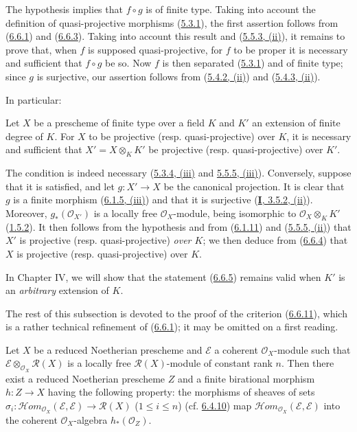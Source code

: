The hypothesis implies that $f\circ g$ is of finite type. Taking into account
the definition of quasi-projective morphisms
(\hyperref[II.5.3.1]{5.3.1}), the first assertion follows from
(\hyperref[II.6.6.1]{6.6.1}) and
(\hyperref[II.6.6.3]{6.6.3}). Taking into account this result and
(\hyperref[II.5.5.3]{5.5.3, (ii)}), it remains to prove that, when $f$ is
supposed quasi-projective, for $f$ to be proper it is necessary and
sufficient that $f\circ g$ be so. Now $f$ is then separated
(\hyperref[II.5.3.1]{5.3.1}) and of finite type; since $g$ is surjective,
our assertion follows from (\hyperref[II.5.4.2]{5.4.2, (ii)}) and
(\hyperref[II.5.4.3]{5.4.3, (ii)}).

In particular:

\begin{corollary}[6.6.5]
\label{II.6.6.5}
Let $X$ be a prescheme of finite type over a field $K$ and $K'$ an extension
of finite degree of $K$. For $X$ to be projective \textup{(resp.} quasi-projective\textup{)}
over $K$, it is necessary and sufficient that $X'=X\otimes_K K'$ be
projective \textup{(resp.} quasi-projective\textup{)} over $K'$.
\end{corollary}

The condition is indeed necessary
(\hyperref[II.5.3.4]{5.3.4, (iii)} and
\hyperref[II.5.5.5]{5.5.5, (iii)}). Conversely, suppose that it is
satisfied, and let $g:X'\to X$ be the canonical projection. It is clear that
$g$ is a finite morphism (\hyperref[II.6.1.5]{6.1.5, (iii)}) and that it is
surjective (\hyperref[I.3.5.2]{\textbf{I}, 3.5.2, (ii)}). Moreover,
$g_*(\mathcal{O}_{X'})$ is a locally free $\mathcal{O}_X$-module, being
isomorphic to $\mathcal{O}_X\otimes_K K'$
(\hyperref[II.1.5.2]{1.5.2}). It then follows from the hypothesis and from
(\hyperref[II.6.1.11]{6.1.11}) and
(\hyperref[II.5.5.5]{5.5.5, (ii)}) that $X'$ is projective (resp.
quasi-projective) \emph{over $K$}; we then deduce from
(\hyperref[II.6.6.4]{6.6.4}) that $X$ is projective (resp.
quasi-projective) over $K$.

In Chapter IV, we will show that the statement
(\hyperref[II.6.6.5]{6.6.5}) remains valid when $K'$ is an
\emph{arbitrary} extension of $K$.

The rest of this subsection is devoted to the proof of the criterion
(\hyperref[II.6.6.11]{6.6.11}), which is a rather technical refinement of
(\hyperref[II.6.6.1]{6.6.1}); it may be omitted on a first reading.

\begin{lemma}[6.6.6]
\label{II.6.6.6}
Let $X$ be a reduced Noetherian prescheme and $\mathcal{E}$ a coherent
$\mathcal{O}_X$-module such that
$\mathcal{E}\otimes_{\mathcal{O}_X}\mathcal{R}(X)$ is a locally free
$\mathcal{R}(X)$-module of constant rank $n$. Then there exist
a reduced Noetherian prescheme $Z$ and a finite birational morphism
$h:Z\to X$ having the following property: the morphisms of sheaves
of sets
$\sigma_i:\mathcal{H}om_{\mathcal{O}_X}(\mathcal{E},\mathcal{E})
\to\mathcal{R}(X)$ \textup{($1\leq i\leq n$)}
(cf. \hyperref[II.6.4.10]{6.4.10}) map
$\mathcal{H}om_{\mathcal{O}_X}(\mathcal{E},\mathcal{E})$ into the
coherent $\mathcal{O}_X$-algebra $h_*(\mathcal{O}_Z)$.
\end{lemma}

